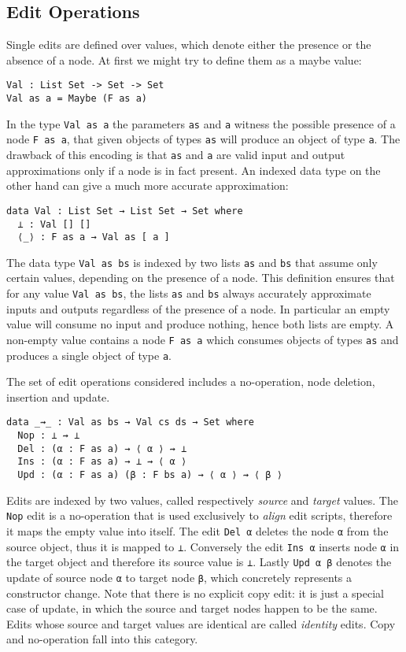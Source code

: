 \documentclass[preprint]{sigplanconf}
\begin{document}
	\subsection{Edit Operations}
	Single edits are defined over values, which denote either the presence or 
	the absence of a node.
        At first we might try to define them as a maybe value:
\begin{verbatim}
Val : List Set -> Set -> Set
Val as a = Maybe (F as a)
\end{verbatim}
        In the type \texttt{Val as a} the parameters \texttt{as} and \texttt{a} 
        witness the possible presence of a node \texttt{F as a}, that given objects 
        of types \texttt{as} will produce an object of type \texttt{a}.
        The drawback of this encoding is that \texttt{as} and \texttt{a} are 
        valid input and output approximations only if a node is in fact present.
        An indexed data type on the other hand can give a much more accurate
        approximation:
\begin{verbatim}
data Val : List Set → List Set → Set where
  ⊥ : Val [] []
  ⟨_⟩ : F as a → Val as [ a ] 
\end{verbatim}
        The data type \texttt{Val as bs} is indexed by two lists \texttt{as} and 
        \texttt{bs} that assume only certain values, depending on the presence
        of a node. This definition ensures that for any value \texttt{Val as bs}, 
        the lists \texttt{as} and \texttt{bs} always accurately approximate inputs 
        and outputs regardless of the presence of a node.
	In particular an empty value will consume no input and produce nothing, hence
        both lists are empty.
        A non-empty value contains a node \texttt{F as a} which consumes 
        objects of types \texttt{as} and produces a single object of type \texttt{a}.

	The set of edit operations considered includes a no-operation, node 
	deletion, insertion and update.
\begin{verbatim}
data _⇝_ : Val as bs → Val cs ds → Set where
  Nop : ⊥ ⇝ ⊥
  Del : (α : F as a) → ⟨ α ⟩ ⇝ ⊥
  Ins : (α : F as a) → ⊥ ⇝ ⟨ α ⟩
  Upd : (α : F as a) (β : F bs a) → ⟨ α ⟩ ⇝ ⟨ β ⟩
\end{verbatim}
	Edits are indexed by two values, called respectively 
	\emph{source} and \emph{target} values. The \texttt{Nop} edit is 
	a no-operation that is used exclusively to \emph{align} edit scripts,
	therefore it maps the empty value into itself.
	The edit \texttt{Del α} deletes the node \texttt{α} from the source object, 
	thus it is mapped to \texttt{⊥}. Conversely the edit \texttt{Ins α} 
	inserts node \texttt{α} in the target object and therefore its source value 
	is 	\texttt{⊥}.
	Lastly \texttt{Upd α β} denotes the update of source node \texttt{α}
	to target node \texttt{β}, which concretely represents a 
	constructor change. 
	Note that there is no explicit copy edit: it is just a special case 
	of update, in which the source and target nodes happen to be the same.
	Edits whose source and target values are identical are 
	called \emph{identity} edits. Copy and no-operation fall into this
	category.
	
\end{document}
